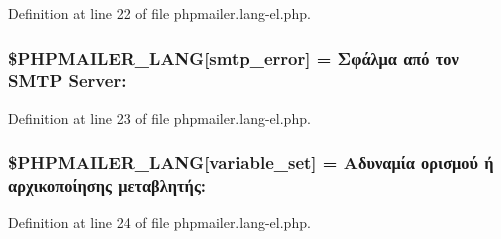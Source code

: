 Definition at line 22 of file phpmailer.\+lang-\/el.\+php.

\subsubsection[{\texorpdfstring{\$\+P\+H\+P\+M\+A\+I\+L\+E\+R\+\_\+\+L\+A\+NG}{$PHPMAILER_LANG}}]{\setlength{\rightskip}{0pt plus 5cm}\$P\+H\+P\+M\+A\+I\+L\+E\+R\+\_\+\+L\+A\+NG\mbox{[}\textquotesingle{}smtp\+\_\+error\textquotesingle{}\mbox{]} = \textquotesingle{}Σφάλμα από τον {\bf S\+M\+TP} Server\+: \textquotesingle{}}\hypertarget{phpmailer_8lang-el_8php_a7d9cffba1e669c845f8a4c891ee50064}{}\label{phpmailer_8lang-el_8php_a7d9cffba1e669c845f8a4c891ee50064}


Definition at line 23 of file phpmailer.\+lang-\/el.\+php.

\subsubsection[{\texorpdfstring{\$\+P\+H\+P\+M\+A\+I\+L\+E\+R\+\_\+\+L\+A\+NG}{$PHPMAILER_LANG}}]{\setlength{\rightskip}{0pt plus 5cm}\$P\+H\+P\+M\+A\+I\+L\+E\+R\+\_\+\+L\+A\+NG\mbox{[}\textquotesingle{}variable\+\_\+set\textquotesingle{}\mbox{]} = \textquotesingle{}Αδυναμία ορισμού ή αρχικοποίησης μεταβλητής\+: \textquotesingle{}}\hypertarget{phpmailer_8lang-el_8php_af795debc7a739d038742691c358d9032}{}\label{phpmailer_8lang-el_8php_af795debc7a739d038742691c358d9032}


Definition at line 24 of file phpmailer.\+lang-\/el.\+php.

